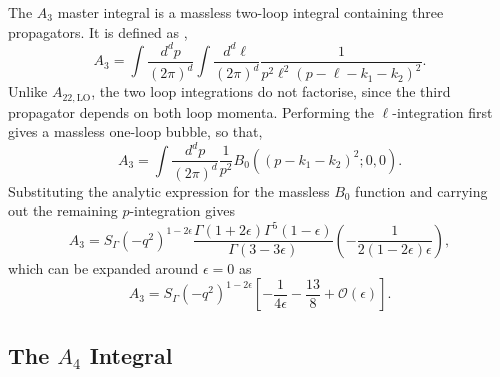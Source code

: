 The $A_3$ master integral is a massless two-loop integral containing three propagators. It is defined
as \cite{Gehrmann-DeRidder:2005btv},
\begin{equation}
    A_3 = \int \frac{d^dp}{(2\pi)^d}\int\frac{d^d\ell}{(2\pi)^d}\frac1{p^2\ell^2(p-\ell-k_1-k_2)^2}.
\end{equation}
Unlike $A_{22,\mathrm{LO}}$, the two loop integrations do not factorise, since the third propagator
depends on both loop momenta. Performing the $\ell$-integration first gives a massless one-loop
bubble, so that,
\begin{equation}
    A_3 = \int \frac{d^dp}{(2\pi)^d}\frac1{p^2}B_0\!\left((p-k_1-k_2)^2;0,0\right).
\end{equation}
Substituting the analytic expression for the massless $B_0$ function and carrying out the remaining
$p$-integration gives
\begin{equation}
    A_3 = S_\Gamma\!\left(-q^2\right)^{1-2\epsilon}\frac{\Gamma(1+2\epsilon)\Gamma^5(1-\epsilon)}{\Gamma(3-3\epsilon)}\!\left(-\frac{1}{2(1-2\epsilon)\epsilon}\right),
\end{equation}
which can be expanded around $\epsilon=0$ as
\begin{equation}
    A_3 = S_\Gamma\!\left(-q^2\right)^{1-2\epsilon}\!\left[-\frac1{4\epsilon}-\frac{13}8+\mathcal O(\epsilon)\right].
\end{equation}

\subsection{The $A_4$ Integral}\label{subsubsec:A4}

